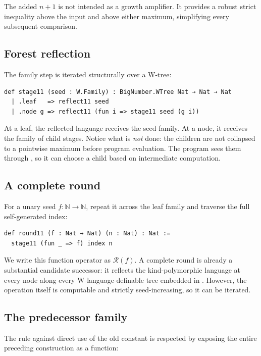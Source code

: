 \documentclass[11pt]{article}
\theoremstyle{definition}
\theoremstyle{remark}
\newcommand{\N}{\mathbb N}
\newcommand{\Round}{\mathcal R}
\newcommand{\lean}[1]{\texttt{\detokenize{#1}}}
\begin{document}
The added $n+1$ is not intended as a growth amplifier. It provides a robust
strict inequality above the input and above either maximum, simplifying every
subsequent comparison.

\subsection{Forest reflection}

The family step is iterated structurally over a W-tree:

\begin{lstlisting}
def stage11 (seed : W.Family) : BigNumber.WTree Nat → Nat → Nat
  | .leaf   => reflect11 seed
  | .node g => reflect11 (fun i => stage11 seed (g i))
\end{lstlisting}

At a leaf, the reflected language receives the seed family. At a node, it
receives the family of child stages. Notice what is \emph{not} done: the
children are not collapsed to a pointwise maximum before program evaluation.
The program sees them through \lean{packFamily}, so it can choose a child based
on intermediate computation.

\subsection{A complete round}

For a unary seed $f:\N\to\N$, repeat it across the leaf family and traverse the
full self-generated index:

\begin{lstlisting}
def round11 (f : Nat → Nat) (n : Nat) : Nat :=
  stage11 (fun _ => f) index n
\end{lstlisting}

We write this function operator as $\Round(f)$. A complete round is already a
substantial candidate successor: it reflects the kind-polymorphic language at
every node along every W-language-definable tree embedded in \lean{index}.
However, the operation itself is computable and strictly seed-increasing, so it
can be iterated.

\subsection{The predecessor family}

The rule against direct use of the old constant is respected by exposing the
entire preceding construction as a function:
\end{document}
